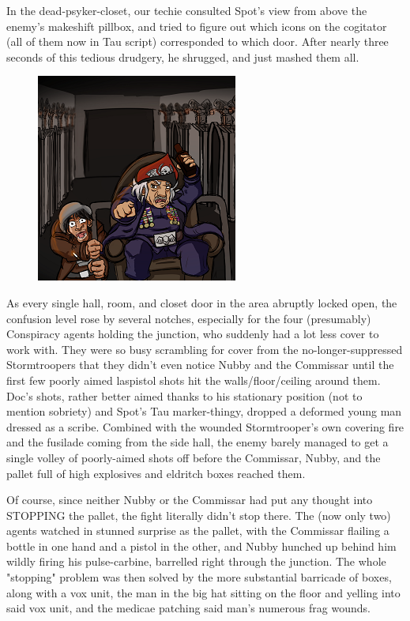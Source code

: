 In the dead-psyker-closet, our techie consulted Spot's view from above the enemy's makeshift pillbox, and tried to figure out which icons on the cogitator (all of them now in Tau script) corresponded to which door. 
After nearly three seconds of this tedious drudgery, he shrugged, and just mashed them all. 


\begin{figure}
	\begin{center}
		\includegraphics[width=\figwidth]{pics/21/103.png}
	\end{center}
\end{figure}
As every single hall, room, and closet door in the area abruptly locked open, the confusion level rose by several notches, especially for the four (presumably) Conspiracy agents holding the junction, who suddenly had a lot less cover to work with. 
They were so busy scrambling for cover from the no-longer-suppressed Stormtroopers that they didn't even notice Nubby and the Commissar until the first few poorly aimed laspistol shots hit the walls/floor/ceiling around them. 
Doc's shots, rather better aimed thanks to his stationary position (not to mention sobriety) and Spot's Tau marker-thingy, dropped a deformed young man dressed as a scribe. 
Combined with the wounded Stormtrooper's own covering fire and the fusilade coming from the side hall, the enemy barely managed to get a single volley of poorly-aimed shots off before the Commissar, Nubby, and the pallet full of high explosives and eldritch boxes reached them. 


Of course, since neither Nubby or the Commissar had put any thought into STOPPING the pallet, the fight literally didn't stop there. 
The (now only two) agents watched in stunned surprise as the pallet, with the Commissar flailing a bottle in one hand and a pistol in the other, and Nubby hunched up behind him wildly firing his pulse-carbine, barrelled right through the junction. 
The whole "stopping" problem was then solved by the more substantial barricade of boxes, along with a vox unit, the man in the big hat sitting on the floor and yelling into said vox unit, and the medicae patching said man's numerous frag wounds.

